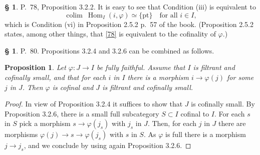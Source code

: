 \documentclass[12pt]{article}
\newtheorem{prop}[thm]{Proposition}
\theoremstyle{remark}
\theoremstyle{definition}
\newtheorem{s}[thm]{\S}
\newcommand{\pt}{\{\text{pt}\}}
\newcommand{\pp}{\varphi}
\DeclareMathOperator*{\colim}{colim}
\DeclareMathOperator{\Hom}{Hom}
\begin{document}
%

\begin{s} 
P.~78, Proposition 3.2.2. It is easy to see that Condition (iii) is equivalent to
%
\begin{equation}\label{78} 
\colim\ \Hom_I(i,\pp)\simeq\pt\quad\text{for all }i\in I, 
\end{equation} 
%
which is Condition (vi) in Proposition 2.5.2 p.~57 of the book. (Proposition 2.5.2 states, among other things, that \eqref{78} is equivalent to the cofinality of $\pp$.)
\end{s}

%

\begin{s} 
P.~80. Propositions 3.2.4 and 3.2.6 can be combined as follows. 

\begin{prop}\label{comb}
Let $\pp:J\to I$ be fully faithful. Assume that $I$ is filtrant and cofinally small, and that for each $i$ in $I$ there is a morphism $i\to\pp(j)$ for some $j$ in $J$. Then $\pp$ is cofinal and $J$ is filtrant and cofinally small. 
\end{prop} 

\begin{proof}
In view of Proposition 3.2.4 it suffices to show that $J$ is cofinally small. By Proposition 3.2.6, there is a small full subcategory $S\subset I$ cofinal to $I$. For each $s$ in $S$ pick a morphism $s\to\pp(j_s)$ with $j_s$ in $J$. Then, for each $j$ in $J$ there are morphisms $\pp(j)\to s\to\pp(j_s)$ with $s$ in $S$. As $\pp$ is full there is a morphism $j\to j_s$, and we conclude by using again Proposition 3.2.6.
\end{proof}
\end{s}

%
\end{document}
